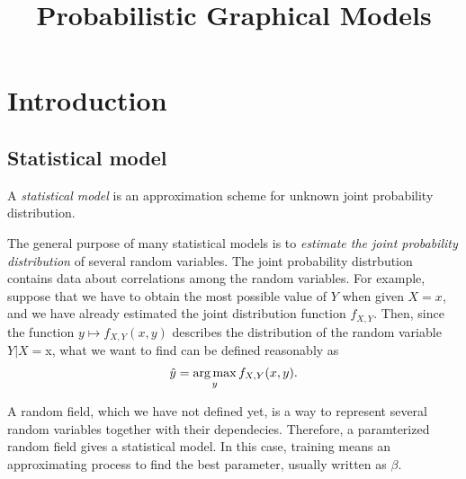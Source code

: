 \documentclass{../exp}
\title{Probabilistic Graphical Models}
\begin{document}
\maketitle
\tableofcontents





%     



\section{Introduction}

\subsection{Statistical model}
\begin{defn}
A \emph{statistical model} is an approximation scheme for unknown joint probability distribution.
\end{defn}
The general purpose of many statistical models is to \emph{estimate the joint probability distribution} of several random variables.
The joint probability distrbution contains data about correlations among the random variables.
For example, suppose that we have to obtain the most possible value of $Y$ when given $X=x$, and we have already estimated the joint distribution function $f_{X,Y}$.
Then, since the function $y\mapsto f_{X,Y}(x,y)$ describes the distribution of the random variable $Y|X=$x, what we want to find can be defined reasonably as
\[\hat y=\operatorname*{arg\,max}_yf_{X,Y}(x,y).\]

\begin{ex}
A random field, which we have not defined yet, is a way to represent several random variables together with their dependecies.
Therefore, a paramterized random field gives a statistical model.
In this case, training means an approximating process to find the best parameter, usually written as $\beta$.
\end{ex}
\end{document}
